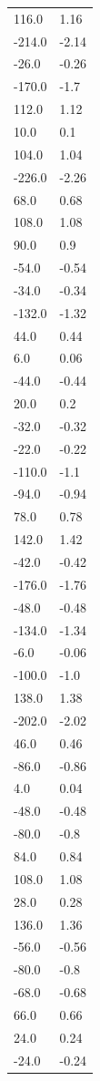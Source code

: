 \begin{longtable}{ll}
116.0 & 1.16 \\
-214.0 & -2.14 \\
-26.0 & -0.26 \\
-170.0 & -1.7 \\
112.0 & 1.12 \\
10.0 & 0.1 \\
104.0 & 1.04 \\
-226.0 & -2.26 \\
68.0 & 0.68 \\
108.0 & 1.08 \\
90.0 & 0.9 \\
-54.0 & -0.54 \\
-34.0 & -0.34 \\
-132.0 & -1.32 \\
44.0 & 0.44 \\
6.0 & 0.06 \\
-44.0 & -0.44 \\
20.0 & 0.2 \\
-32.0 & -0.32 \\
-22.0 & -0.22 \\
-110.0 & -1.1 \\
-94.0 & -0.94 \\
78.0 & 0.78 \\
142.0 & 1.42 \\
-42.0 & -0.42 \\
-176.0 & -1.76 \\
-48.0 & -0.48 \\
-134.0 & -1.34 \\
-6.0 & -0.06 \\
-100.0 & -1.0 \\
138.0 & 1.38 \\
-202.0 & -2.02 \\
46.0 & 0.46 \\
-86.0 & -0.86 \\
4.0 & 0.04 \\
-48.0 & -0.48 \\
-80.0 & -0.8 \\
84.0 & 0.84 \\
108.0 & 1.08 \\
28.0 & 0.28 \\
136.0 & 1.36 \\
-56.0 & -0.56 \\
-80.0 & -0.8 \\
-68.0 & -0.68 \\
66.0 & 0.66 \\
24.0 & 0.24 \\
-24.0 & -0.24 \\

\end{longtable}
